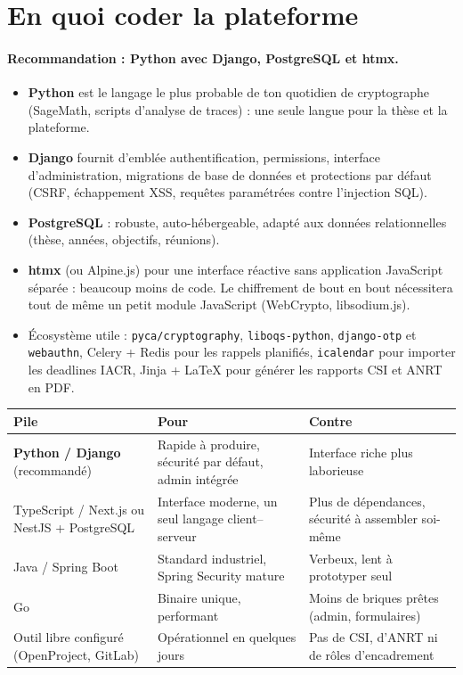 \documentclass[11pt,a4paper]{article}
\begin{document}
\section{En quoi coder la plateforme}

\paragraph{Recommandation : Python avec Django, PostgreSQL et htmx.}
\begin{itemize}
  \item \textbf{Python} est le langage le plus probable de ton quotidien de
  cryptographe (SageMath, scripts d'analyse de traces) : une seule langue pour la
  thèse et la plateforme.
  \item \textbf{Django} fournit d'emblée authentification, permissions, interface
  d'administration, migrations de base de données et protections par défaut (CSRF,
  échappement XSS, requêtes paramétrées contre l'injection SQL).
  \item \textbf{PostgreSQL} : robuste, auto-hébergeable, adapté aux données
  relationnelles (thèse, années, objectifs, réunions).
  \item \textbf{htmx} (ou Alpine.js) pour une interface réactive sans application
  JavaScript séparée : beaucoup moins de code. Le chiffrement de bout en bout
  nécessitera tout de même un petit module JavaScript (WebCrypto, libsodium.js).
  \item Écosystème utile : \texttt{pyca/cryptography}, \texttt{liboqs-python},
  \texttt{django-otp} et \texttt{webauthn}, Celery + Redis pour les rappels
  planifiés, \texttt{icalendar} pour importer les deadlines IACR, Jinja + LaTeX
  pour générer les rapports CSI et ANRT en PDF.
\end{itemize}

\begin{center}\small
\begin{tabularx}{\linewidth}{P{3.6cm} L L}
\toprule
\textbf{Pile} & \textbf{Pour} & \textbf{Contre}\\
\midrule
\textbf{Python / Django} (recommandé) & Rapide à produire, sécurité par défaut, admin intégrée & Interface riche plus laborieuse\\
TypeScript / Next.js ou NestJS + PostgreSQL & Interface moderne, un seul langage client--serveur & Plus de dépendances, sécurité à assembler soi-même\\
Java / Spring Boot & Standard industriel, Spring Security mature & Verbeux, lent à prototyper seul\\
Go & Binaire unique, performant & Moins de briques prêtes (admin, formulaires)\\
Outil libre configuré (OpenProject, GitLab) & Opérationnel en quelques jours & Pas de CSI, d'ANRT ni de rôles d'encadrement\\
\bottomrule
\end{tabularx}
\end{center}
\end{document}
